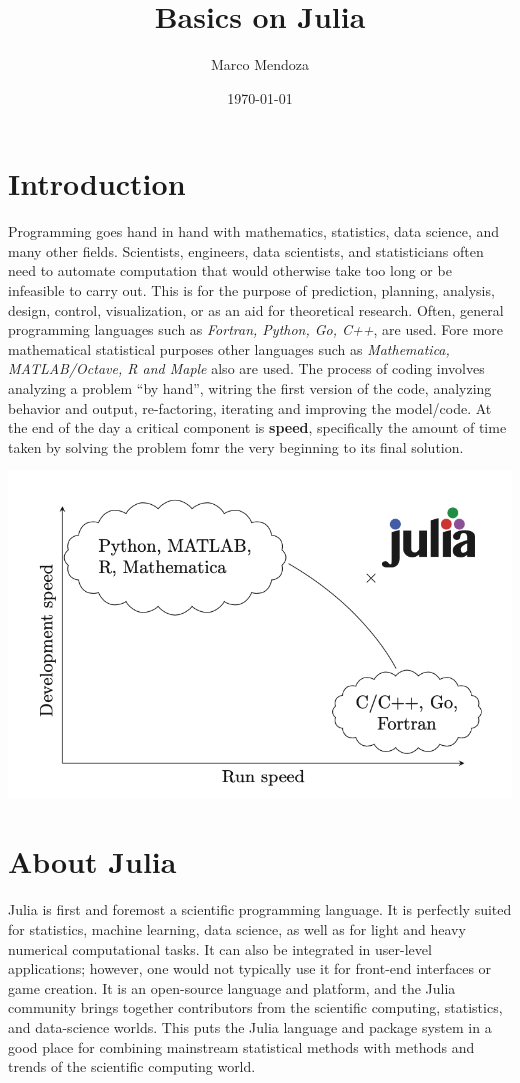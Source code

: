 \documentclass[11pt]{article}
\author{Marco Mendoza}
\date{\today}
\title{Basics on Julia}
\begin{document}
\maketitle
\tableofcontents


\section{Introduction}
\label{sec:org9b9d917}
Programming goes hand in hand with mathematics, statistics, data science, and many other fields. Scientists, engineers, data scientists, and statisticians often need to automate computation that would otherwise take too long or be infeasible to carry out. This is for the purpose of prediction, planning, analysis, design, control, visualization, or as an aid for theoretical research. Often, general programming languages such as \emph{Fortran, Python, Go, C++}, are used. Fore more mathematical statistical purposes other languages such as \emph{Mathematica, MATLAB/Octave, R and Maple} also are used. The process of coding involves analyzing a problem ``by hand'', witring the first version of the code, analyzing behavior and output, re-factoring, iterating and improving the model/code. At the end of the day a critical component is \textbf{speed}, specifically the amount of time taken by solving the problem fomr the very beginning to its final solution.

\begin{center}
\includegraphics[width=.9\linewidth]{run_speed.png}
\end{center}

\section{About Julia}
\label{sec:org22ab82b}
Julia is first and foremost a scientific programming language. It is perfectly suited for statistics, machine learning, data science, as well as for light and heavy numerical computational tasks. It can also be integrated in user-level applications; however, one would not typically use it for front-end interfaces or game creation. It is an open-source language and platform, and the Julia community brings together contributors from the scientific computing, statistics, and data-science worlds. This puts the Julia language and package system in a good place for combining mainstream statistical methods with methods and trends of the scientific computing world.
\end{document}
